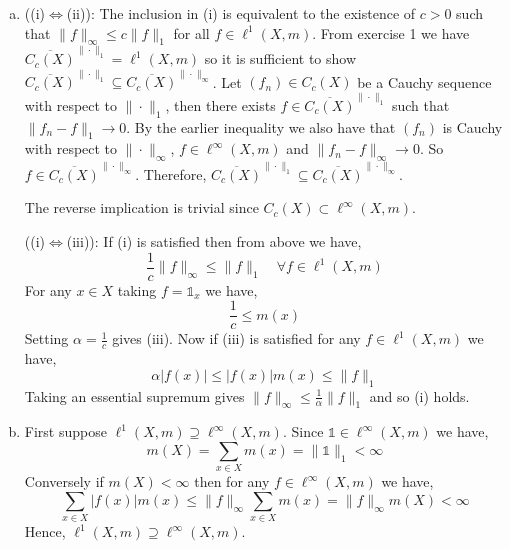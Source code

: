 \begin{enumerate}[(a)]
	\item 
		((i)$\iff$(ii)): The inclusion in (i) is equivalent to the existence of $c>0$ such that $\|f\|_{\infty}\leq c\|f\|_{1}$ for all $f\in\ell^{1}(X,m)$. From exercise 1 we have $\overline{C_{c}(X)}^{\|\cdot\|_{1}}=\ell^{1}(X,m)$ so it is sufficient to show $\overline{C_{c}(X)}^{\|\cdot\|_{1}}\subseteq \overline{C_{c}(X)}^{\|\cdot\|_{\infty}}$. Let $(f_{n})\in C_{c}(X)$ be a Cauchy sequence with respect to $\|\cdot\|_{1}$, then there exists $f\in\overline{C_{c}(X)}^{\|\cdot\|_{1}}$ such that $\|f_{n}-f\|_{1}\to 0$. By the earlier inequality we also have that $(f_{n})$ is Cauchy with respect to $\|\cdot\|_{\infty}$, $f\in\ell^{\infty}(X,m)$ and $\|f_{n}-f\|_{\infty}\to 0$. So $f\in\overline{C_{c}(X)}^{\|\cdot\|_{\infty}}$. Therefore, $\overline{C_{c}(X)}^{\|\cdot\|_{1}}\subseteq\overline{C_{c}(X)}^{\|\cdot\|_{\infty}}$.

		The reverse implication is trivial since $C_{c}(X)\subset\ell^{\infty}(X,m)$.

		((i)$\iff$(iii)): If (i) is satisfied then from above we have,
		\begin{equation*}
			\frac{1}{c}\|f\|_{\infty}\leq \|f\|_{1} \quad \forall f\in\ell^{1}(X,m)
		\end{equation*}
		For any $x\in X$ taking $f=\mathds{1}_{x}$ we have,
		\begin{equation*}
			\frac{1}{c}\leq m(x)
		\end{equation*}
		Setting $\alpha=\frac{1}{c}$ gives (iii). Now if (iii) is satisfied for any $f\in\ell^{1}(X,m)$ we have,
		\begin{equation*}
			\alpha |f(x)| \leq |f(x)|m(x) \leq \|f\|_{1}
		\end{equation*}
		Taking an essential supremum gives $\|f\|_{\infty}\leq\frac{1}{\alpha}\|f\|_{1}$ and so (i) holds.
	\item 
		First suppose $\ell^{1}(X,m)\supseteq\ell^{\infty}(X,m)$. Since $\mathds{1}\in\ell^{\infty}(X,m)$ we have,
		\begin{equation*}
			m(X)=\sum_{x\in X}m(x) = \|\mathds{1}\|_{1} < \infty
		\end{equation*}
		Conversely if $m(X)<\infty$ then for any $f\in\ell^{\infty}(X,m)$ we have,
		\begin{equation*}
			\sum_{x\in X}|f(x)|m(x) \leq \|f\|_{\infty}\sum_{x\in X}m(x) = \|f\|_{\infty}m(X) < \infty
		\end{equation*}
		Hence, $\ell^{1}(X,m)\supseteq\ell^{\infty}(X,m)$.
\end{enumerate}
